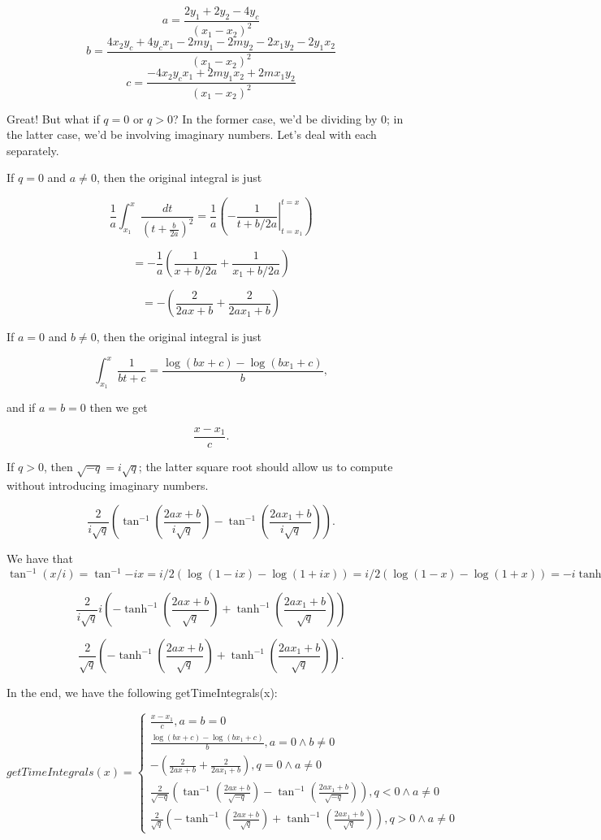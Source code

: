 \documentclass{article}
\begin{document}
$$a=\frac{2y_1+2y_2-4y_c}{(x_1-x_2)^2}$$
$$b=\frac{4 x_2 y_c + 4 y_c x_1 - 2 m y_1 - 2 m y_2 - 2 x_1 y_2 - 2 y_1 x_2}{(x_1-x_2)^2}$$
$$c=\frac{-4 x_2 y_c x_1 + 2 m y_1 x_2 + 2 m x_1 y_2}{(x_1-x_2)^2}$$

Great! But what if $q=0$ or $q> 0$? In the former case, we'd be dividing by $0$; in the latter case, we'd be involving imaginary numbers. Let's deal with each separately.

If $q=0$ and $a\neq 0$, then the original integral is just

$$\frac{1}{a}\int_{x_1}^x\frac{dt}{\left(t+\frac{b}{2a}\right)^2}=\frac{1}{a}\left(\left.-\frac{1}{t+b/2a}\right\vert_{t=x_1}^{t=x}\right)$$

$$=-\frac{1}{a}\left(\frac{1}{x+b/2a}+\frac{1}{x_1+b/2a}\right)$$

$$=-\left(\frac{2}{2ax+b}+\frac{2}{2ax_1+b}\right)$$

If $a = 0$ and $b\neq 0$, then the original integral is just

$$\int_{x_1}^x\frac{1}{bt+c}= \frac{\log(bx+c)-\log(bx_1+c)}{b},$$

and if $a=b=0$ then we get

$$\frac{x-x_1}{c}.$$

If $q>0$, then $\sqrt{-q}=i\sqrt{q}$; the latter square root should allow us to compute without introducing imaginary numbers.

$$\frac{2}{i\sqrt{q}}\left(\tan^{-1}\left(\frac{2ax+b}{i\sqrt{q}}\right)-\tan^{-1}\left(\frac{2ax_1+b}{i\sqrt{q}}\right)\right).$$

We have that $\tan^{-1}(x/i)=\tan^{-1}{-ix}=i/2(\log(1-ix)-\log(1+ix))=i/2(\log(1-x)-\log(1+x))=-i\tanh^{-1}{x}:$

$$\frac{2}{i\sqrt{q}}i\left(-\tanh^{-1}\left(\frac{2ax+b}{\sqrt{q}}\right)+\tanh^{-1}\left(\frac{2ax_1+b}{\sqrt{q}}\right)\right)$$

$$\frac{2}{\sqrt{q}}\left(-\tanh^{-1}\left(\frac{2ax+b}{\sqrt{q}}\right)+\tanh^{-1}\left(\frac{2ax_1+b}{\sqrt{q}}\right)\right).$$

In the end, we have the following getTimeIntegrals(x):

$$getTimeIntegrals(x)=\begin{cases}
\frac{x-x_1}{c}, a=b=0 \\
\frac{\log(bx+c)-\log(bx_1+c)}{b}, a=0 \land b\neq 0 \\
-\left(\frac{2}{2ax+b}+\frac{2}{2ax_1+b}\right), q=0 \land a\neq 0 \\
\frac{2}{\sqrt{-q}}\left(\tan^{-1}\left(\frac{2ax+b}{\sqrt{-q}}\right)-\tan^{-1}\left(\frac{2ax_1+b}{\sqrt{-q}}\right)\right), q<0 \land a\neq 0 \\
\frac{2}{\sqrt{q}}\left(-\tanh^{-1}\left(\frac{2ax+b}{\sqrt{q}}\right)+\tanh^{-1}\left(\frac{2ax_1+b}{\sqrt{q}}\right)\right), q>0 \land a\neq 0
\end{cases}$$
\end{document}
